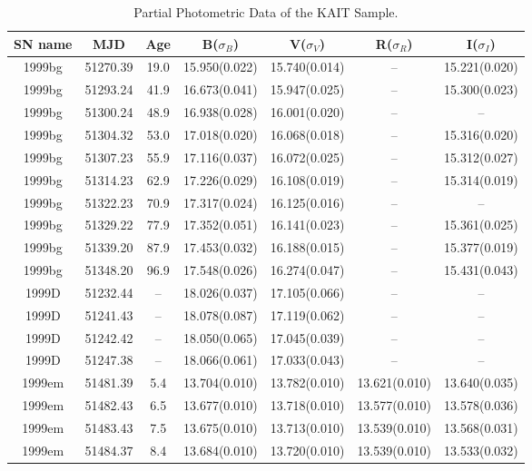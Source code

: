 
 
\begin{table*}
\caption{Partial Photometric Data of the KAIT Sample.\label{t:phot}}
\begin{tabular}{ccccccc}
\hline\hline
SN name &
MJD &
Age \tablenotemark{a} &
B($\sigma_B$) &
V($\sigma_V$) &
R($\sigma_R$) &
I($\sigma_I$)\\
\hline
1999bg	  & 51270.39	 & 19.0	& 15.950(0.022)	 & 15.740(0.014)	 & --	 & 15.221(0.020) \\ 
1999bg	  & 51293.24	 & 41.9	& 16.673(0.041)	 & 15.947(0.025)	 & --	 & 15.300(0.023) \\ 
1999bg	  & 51300.24	 & 48.9	& 16.938(0.028)	 & 16.001(0.020)	 & --	 & -- \\ 
1999bg	  & 51304.32	 & 53.0	& 17.018(0.020)	 & 16.068(0.018)	 & --	 & 15.316(0.020) \\ 
1999bg	  & 51307.23	 & 55.9	& 17.116(0.037)	 & 16.072(0.025)	 & --	 & 15.312(0.027) \\ 
1999bg	  & 51314.23	 & 62.9	& 17.226(0.029)	 & 16.108(0.019)	 & --	 & 15.314(0.019) \\ 
1999bg	  & 51322.23	 & 70.9	& 17.317(0.024)	 & 16.125(0.016)	 & --	 & -- \\ 
1999bg	  & 51329.22	 & 77.9	& 17.352(0.051)	 & 16.141(0.023)	 & --	 & 15.361(0.025) \\ 
1999bg	  & 51339.20	 & 87.9	& 17.453(0.032)	 & 16.188(0.015)	 & --	 & 15.377(0.019) \\ 
1999bg	  & 51348.20	 & 96.9	& 17.548(0.026)	 & 16.274(0.047)	 & --	 & 15.431(0.043) \\ 
1999D	  & 51232.44	 & --	& 18.026(0.037)	 & 17.105(0.066)	 & --	 & -- \\ 
1999D	  & 51241.43	 & --	& 18.078(0.087)	 & 17.119(0.062)	 & --	 & -- \\ 
1999D	  & 51242.42	 & --	& 18.050(0.065)	 & 17.045(0.039)	 & --	 & -- \\ 
1999D	  & 51247.38	 & --	& 18.066(0.061)	 & 17.033(0.043)	 & --	 & -- \\ 
1999em	  & 51481.39	 & 5.4	& 13.704(0.010)	 & 13.782(0.010)	 & 13.621(0.010)	 & 13.640(0.035) \\ 
1999em	  & 51482.43	 & 6.5	& 13.677(0.010)	 & 13.718(0.010)	 & 13.577(0.010)	 & 13.578(0.036) \\ 
1999em	  & 51483.43	 & 7.5	& 13.675(0.010)	 & 13.713(0.010)	 & 13.539(0.010)	 & 13.568(0.031) \\ 
1999em	  & 51484.37	 & 8.4	& 13.684(0.010)	 & 13.720(0.010)	 & 13.539(0.010)	 & 13.533(0.032) \\ 

\end{tabular}
\end{table*}
